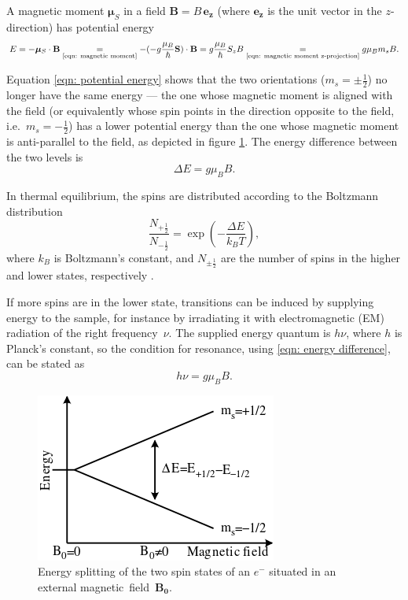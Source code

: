 \documentclass[a4paper]{jpconf}
\numberwithin{equation}{section}
\begin{document}
A magnetic moment $\bm{\mu}_S$ in a field $\mathbf{B} = B \, \mathbf{e_z}$ (where $\mathbf{e_z}$ is the unit vector in the $z$-direction) has potential energy
\begin{equation}
	E = - \bm{\mu}_S \cdot \mathbf{B} \underset{\text{\eqref{eqn: magnetic moment}}}{=}  - (- g \frac{\mu_B}{\hbar} \mathbf{S})\cdot\mathbf{B}
	  = g \frac{\mu_B}{\hbar}S_z B 
	  \underset{\text{\eqref{eqn: magnetic moment z-projection}}}{=} g\mu_Bm_sB \label{eqn: potential energy}.
\end{equation}

Equation \eqref{eqn: potential energy} shows that the two orientations ($m_s = \pm\tfrac12$) no longer have the same energy --- the one whose magnetic moment is aligned with the field (or equivalently whose spin points in the direction opposite to the field, i.e.\ $m_s = -\tfrac12$) has a lower potential energy than the one whose magnetic moment is anti-parallel to the field, as depicted in figure \ref{fig: energy splitting}. The energy difference between the two levels is 
\begin{equation}
	\Delta E = g \mu_B B. \label{eqn: energy difference}
\end{equation}

In thermal equilibrium, the spins are distributed according to the Boltzmann distribution
\[
    \frac{N_{+\tfrac12}}{N_{-\tfrac12}} = \exp(- \frac{\Delta E}{k_B T}),
\]
where $k_B$ is Boltzmann\textquoteright s constant, and $N_{\pm\tfrac12}$ are the number of spins in the higher and lower states, respectively \cite{Gero}. 

If more spins are in the lower state, transitions can be induced by supplying energy to the sample, for instance by irradiating it with electromagnetic (EM) radiation of the right frequency~$\nu$. The supplied energy quantum is $h \nu$, where $h$ is Planck's constant, so the condition for resonance, using \eqref{eqn: energy difference}, can be stated as
\begin{equation}
	h\nu = g\mu_B B. \label{eqn: resonance condition}
\end{equation}

\begin{figure}[t!]
	\includegraphics[scale=0.75]{EPR_splitting.png}
	\hspace{2pc}
	\begin{minipage}[b]{3in}
		\caption{Energy splitting of the two spin states of an $e^-$ situated in an external magnetic~field~$\mathbf{B_0}$.}
		\label{fig: energy splitting}
	\end{minipage}
\end{figure}
\end{document}
